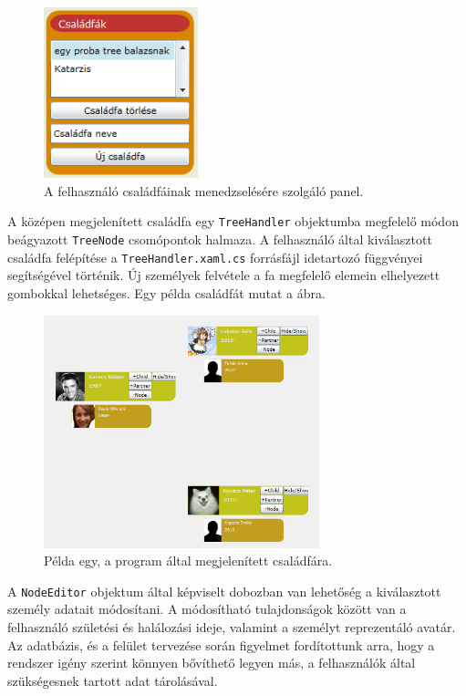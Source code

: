 \begin{figure}[!ht]
\centering
\includegraphics[width=45mm, keepaspectratio]{figures/csaladfa-panel.png}
\caption{A felhasználó családfáinak menedzselésére szolgáló panel.}
\label{fig:csaladfa_panel}
\end{figure}

\bigskip

A középen megjelenített családfa egy \texttt{TreeHandler} objektumba megfelelő módon beágyazott \texttt{TreeNode} csomópontok halmaza. A felhasználó által kiválasztott családfa felépítése a \texttt{TreeHandler.xaml.cs} forrásfájl idetartozó függvényei segítségével történik. Új személyek felvétele a fa megfelelő elemein elhelyezett gombokkal lehetséges. Egy példa családfát mutat a  ábra.

\begin{figure}[!ht]
\centering
\includegraphics[width=80mm, keepaspectratio]{figures/famtree.png}
\caption{Példa egy, a program által megjelenített családfára.}
\label{fig:alk_tree}
\end{figure}

\bigskip

A \texttt{NodeEditor} objektum által képviselt dobozban van lehetőség a kiválasztott személy adatait módosítani. A módosítható tulajdonságok között van a felhasználó születési és halálozási ideje, valamint a személyt reprezentáló avatár. Az adatbázis, és a felület tervezése során figyelmet fordítottunk arra, hogy a rendszer igény szerint könnyen bővíthető legyen más, a felhasználók által szükségesnek tartott adat tárolásával.

